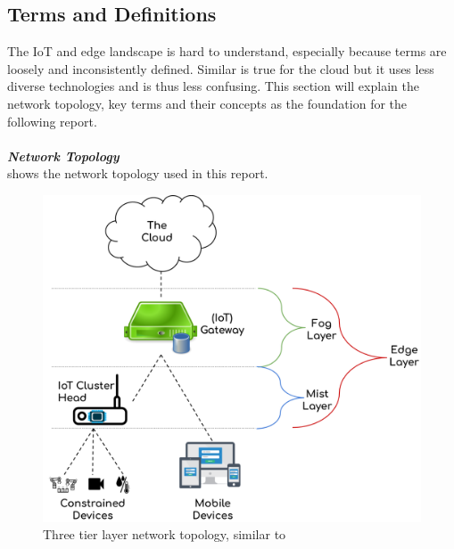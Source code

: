 
\subsection{Terms and Definitions} \label{sec:definitions}
The IoT and edge landscape is hard to understand, especially because terms are loosely and inconsistently defined. Similar is true for the cloud but it uses less diverse technologies and is thus less confusing. This section will explain the network topology, key terms and their concepts as the foundation for the following report.\\
\vspace{0.5mm} \ \\
\textbf{\textit{Network Topology}}\\
 shows the network topology used in this report. 
\begin{figure}[H]
    \centering
    \includegraphics[scale=0.2]{figures/network-topology-3-layer.png}
    \caption{Three tier layer network topology, similar to \cite{nsa2017NextWaveIoTDef}}
    \label{fig:networkTopology3Layer}
\end{figure}

